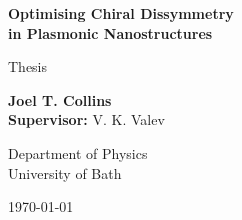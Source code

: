 \begin{center}
    \vspace*{1cm}
    
    \LARGE
    \textbf{Optimising Chiral Dissymmetry\\ in Plasmonic Nanostructures}
    
    \vspace{0.5cm}
    \large
    Thesis
    
    \vspace{1.5cm}
    \normalsize
    \textbf{Joel T. Collins}\\
    \textbf{Supervisor: }V. K. Valev
    
    \vspace{0.8cm}
    Department of Physics\\
    University of Bath
    
    \vspace{0.5cm}
    \today
    
    \vspace{1.5cm}
\end{center}